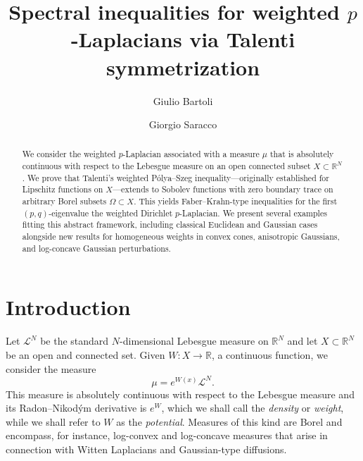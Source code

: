 \documentclass[a4paper,12pt,reqno]{amsart}
\title[Spectral inequalities for weighted $p$-Laplacians]{Spectral inequalities for weighted $p$-Laplacians via Talenti symmetrization}%
\author[G.~Bartoli]{Giulio Bartoli}
\author[G.~Saracco]{Giorgio Saracco}
\numberwithin{equation}{section}
\renewcommand{\H}{\mathcal{H}}
\theoremstyle{plain}
\theoremstyle{definition}
\begin{document}

\begin{abstract}
%
We consider the weighted $p$-Laplacian associated with a measure $\mu$ that is absolutely continuous with respect to the Lebesgue measure on an open connected subset $X\subset\mathbb{R}^N$. 
We prove that Talenti's weighted P\'olya--Szeg\H{o} inequality---originally established for Lipschitz functions on $X$---extends to Sobolev functions with zero boundary trace on arbitrary Borel subsets $\Omega\subset X$. 
This yields Faber--Krahn-type inequalities for the first $(p,q)$-eigenvalue the weighted Dirichlet $p$-Laplacian. 
We present several examples fitting this abstract framework, including classical Euclidean and Gaussian cases alongside new results for homogeneous weights in convex cones, anisotropic Gaussians, and log-concave Gaussian perturbations.%
\end{abstract}

\maketitle


\section{Introduction}

Let $\mathcal{L}^N$ be the standard $N$-dimensional Lebesgue measure on $\mathbb{R}^N$ and let $X\subset\mathbb{R}^N$ be an open and connected set. Given $W:X\to\mathbb{R}$, a continuous function, we consider the measure
%
\begin{equation}
\label{eq:measures}
\mu = e^{W(x)}\mathcal{L}^N.
\end{equation}
%
This measure is absolutely continuous with respect to the Lebesgue measure and its Radon--Nikod\'ym derivative is $e^{W}$, which we shall call the \emph{density} or \emph{weight}, while we shall refer to $W$ as the \emph{potential}. Measures of this kind are Borel and encompass, for instance, log-convex and log-concave measures that arise in connection with Witten Laplacians and Gaussian-type diffusions.
\end{document}
